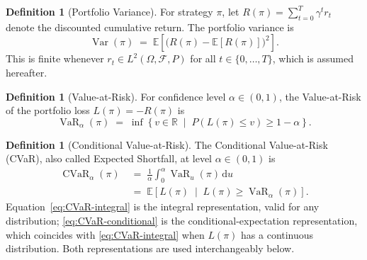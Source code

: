 \documentclass[12pt,openany]{book}
\newcommand{\E}{\mathbb{E}}
\numberwithin{equation}{chapter}
\theoremstyle{plain}
\theoremstyle{definition}
\newtheorem{definition}[theorem]{Definition}
\theoremstyle{remark}
\numberwithin{equation}{chapter}
\theoremstyle{plain}
\DeclareMathOperator{\CVaR}{CVaR}
\DeclareMathOperator{\VaR}{VaR}
\DeclareMathOperator{\Var}{Var}
\begin{document}
\begin{definition}[Portfolio Variance]
\label{def:variance}
For strategy $\pi$, let $R(\pi) = \sum_{t=0}^{T} \gamma^t r_t$ denote
the discounted cumulative return.  The portfolio variance is
\begin{equation}
  \Var(\pi)
  \;=\;
  \E\!\left[\bigl(R(\pi) - \E[R(\pi)]\bigr)^2\right].
  \label{eq:variance}
\end{equation}
This is finite whenever $r_t \in L^2(\Omega, \mathcal{F}, P)$ for all
$t \in \{0,\ldots,T\}$, which is assumed hereafter.
\end{definition}

\begin{definition}[Value-at-Risk]
\label{def:var-obj}
For confidence level $\alpha \in (0,1)$, the Value-at-Risk of the
portfolio loss $L(\pi) = -R(\pi)$ is
\begin{equation}
  \VaR_\alpha(\pi)
  \;=\;
  \inf\!\left\{v \in \mathbb{R}
    \;\middle|\;
    P\!\left(L(\pi) \leq v\right) \geq 1 - \alpha
  \right\}.
  \label{eq:VaR}
\end{equation}
\end{definition}

\begin{definition}[Conditional Value-at-Risk]
\label{def:cvar-obj}
The Conditional Value-at-Risk (CVaR), also called Expected Shortfall,
at level $\alpha \in (0,1)$ is
\begin{align}
  \CVaR_\alpha(\pi)
  &\;=\;
  \frac{1}{\alpha}
  \int_{0}^{\alpha} \VaR_u(\pi)\,\mathrm{d}u
  \label{eq:CVaR-integral} \\[4pt]
  &\;=\;
  \E\!\left[L(\pi) \;\middle|\; L(\pi) \geq \VaR_\alpha(\pi)\right].
  \label{eq:CVaR-conditional}
\end{align}
Equation~\eqref{eq:CVaR-integral} is the integral representation,
valid for any distribution; \eqref{eq:CVaR-conditional} is the
conditional-expectation representation, which coincides with
\eqref{eq:CVaR-integral} when $L(\pi)$ has a continuous distribution.
Both representations are used interchangeably below.
\end{definition}
\end{document}
